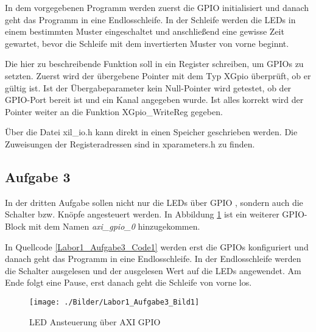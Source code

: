 In dem vorgegebenen Programm werden zuerst die GPIO initialisiert und danach geht das Programm in eine Endlosschleife. In der Schleife werden die LEDs in einem bestimmten Muster eingeschaltet und anschließend eine gewisse Zeit gewartet, bevor die Schleife mit dem invertierten Muster von vorne beginnt.

    {Die hier zu beschreibende Funktion soll in ein Register schreiben, um GPIOs zu setzten. Zuerst wird der übergebene Pointer mit dem Typ XGpio überprüft, ob er gültig ist. Ist der Übergabeparameter kein Null-Pointer wird getestet, ob der GPIO-Port bereit ist und ein Kanal angegeben wurde. Ist alles korrekt wird der Pointer weiter an die Funktion XGpio\_WriteReg gegeben.}

    {Über die Datei xil\_io.h kann direkt in einen Speicher geschrieben werden. Die Zuweisungen der Registeradressen sind in xparameters.h zu finden.}
    
\subsection{Aufgabe 3}
In der dritten Aufgabe sollen nicht nur die LEDs über GPIO , sondern auch die Schalter bzw. Knöpfe angesteuert werden. In Abbildung \ref{Labor1_Aufgabe3_Bild1} ist ein weiterer GPIO-Block mit dem Namen \textit{axi\_gpio\_0} hinzugekommen.

In Quellcode \ref{Labor1_Aufgabe3_Code1} werden erst die GPIOs konfiguriert und danach geht das Programm in eine Endlosschleife. In der Endlosschleife werden die Schalter ausgelesen und der ausgelesen Wert auf die LEDs angewendet. Am Ende folgt eine Pause, erst danach geht die Schleife von vorne los.

\begin{figure}[hbt]
	\centering
	\texttt{[image: ./Bilder/Labor1\_Aufgabe3\_Bild1]}
	\caption{LED Ansteuerung über AXI GPIO}
	\label{Labor1_Aufgabe3_Bild1}
\end{figure}
\FloatBarrier
